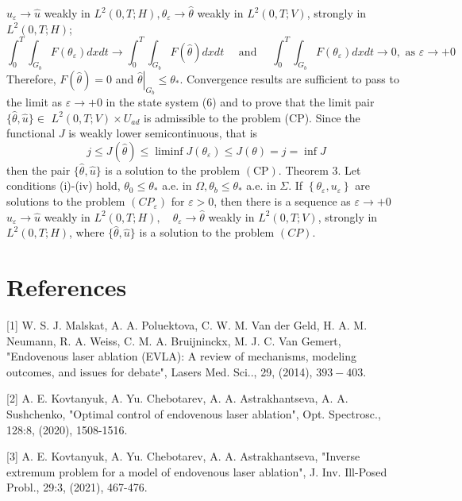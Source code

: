 \documentclass[10pt]{article}
\begin{document}
$u_{\varepsilon} \rightarrow \widehat{u}$ weakly in $L^{2}(0, T ; H), \theta_{\varepsilon} \rightarrow \widehat{\theta}$ weakly in $L^{2}(0, T ; V)$, strongly in $L^{2}(0, T ; H)$;
$$
\int_{0}^{T} \int_{G_{b}} F\left(\theta_{\varepsilon}\right) d x d t \rightarrow \int_{0}^{T} \int_{G_{b}} F(\widehat{\theta}) d x d t \quad \text { and } \quad \int_{0}^{T} \int_{G_{b}} F\left(\theta_{\varepsilon}\right) d x d t \rightarrow 0, \text { as } \varepsilon \rightarrow+0
$$
Therefore, $F(\widehat{\theta})=0$ and $\left.\widehat{\theta}\right|_{G_{b}} \leq \theta_{*}$. Convergence results are sufficient to pass to the limit as $\varepsilon \rightarrow+0$ in the state system (6) and to prove that the limit pair $\{\widehat{\theta}, \widehat{u}\} \in$ $L^{2}(0, T ; V) \times U_{a d}$ is admissible to the problem (CP). Since the functional $J$ is weakly lower semicontinuous, that is
$$
j \leq J(\widehat{\theta}) \leq \liminf J\left(\theta_{\varepsilon}\right) \leq J(\theta)=j=\inf J
$$
then the pair $\{\widehat{\theta}, \widehat{u}\}$ is a solution to the problem $(\mathrm{CP})$. Theorem 3. Let conditions (i)-(iv) hold, $\theta_{0} \leq \theta_{*}$ a.e. in $\Omega, \theta_{b} \leq \theta_{*}$ a.e. in $\Sigma$. If $\left\{\theta_{\varepsilon}, u_{\varepsilon}\right\}$ are solutions to the problem $\left(C P_{\varepsilon}\right)$ for $\varepsilon>0$, then there is a sequence as $\varepsilon \rightarrow+0$ $u_{\varepsilon} \rightarrow \widehat{u}$ weakly in $L^{2}(0, T ; H), \quad \theta_{\varepsilon} \rightarrow \widehat{\theta}$ weakly in $L^{2}(0, T ; V)$, strongly in $L^{2}(0, T ; H)$, where $\{\widehat{\theta}, \widehat{u}\}$ is a solution to the problem $(C P)$.

\section{References}
[1] W. S. J. Malskat, A. A. Poluektova, C. W. M. Van der Geld, H. A. M. Neumann, R. A. Weiss, C. M. A. Bruijninckx, M. J. C. Van Gemert, "Endovenous laser ablation (EVLA): A review of mechanisms, modeling outcomes, and issues for debate", Lasers Med. Sci.., 29, (2014), $393-403$.

[2] A. E. Kovtanyuk, A. Yu. Chebotarev, A. A. Astrakhantseva, A. A. Sushchenko, "Optimal control of endovenous laser ablation", Opt. Spectrosc., 128:8, (2020), 1508-1516.

[3] A. E. Kovtanyuk, A. Yu. Chebotarev, A. A. Astrakhantseva, "Inverse extremum problem for a model of endovenous laser ablation", J. Inv. Ill-Posed Probl., 29:3, (2021), 467-476.
\end{document}
